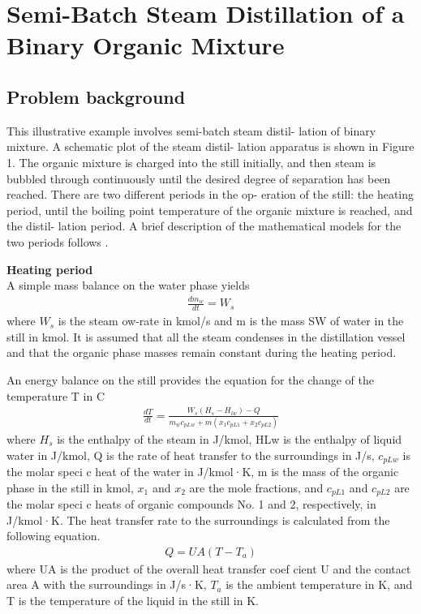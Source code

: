 \documentclass[12pt]{report}
\begin{document}
\section{Semi-Batch Steam Distillation of a Binary Organic Mixture}
\subsection{Problem background}
This illustrative example involves semi-batch steam distil- lation of binary mixture. A schematic plot of the steam distil- lation apparatus is shown in Figure 1. The organic mixture is charged into the still initially, and then steam is bubbled through continuously until the desired degree of separation has been reached. There are two different periods in the op- eration of the still: the heating period, until the boiling point temperature of the organic mixture is reached, and the distil- lation period. A brief description of the mathematical models for the two periods follows \cite{PHD}.

\textbf{Heating period} \\
A simple mass balance on the water phase yields
\begin{gather*}
\frac{dm_w}{dt} = W_s 
\end{gather*}
where $W_s$ is the steam  ow-rate in kmol/s and m is the mass SW
of water in the still in kmol. It is assumed that all the steam condenses in the distillation vessel and that the organic phase masses remain constant during the heating period.

An energy balance on the still provides the equation for the change of the temperature T in \degree C
\begin{gather*}
\frac{dT}{dt} = \frac{W_s(H_s-H_{lw}) - Q}{m_wc_{pLw}+m(x_1c_{pL1}+x_2c_{pL2})}
\end{gather*}
where $H_s$ is the enthalpy of the steam in J/kmol, HLw is the enthalpy of liquid water in J/kmol, Q is the rate of heat transfer to the surroundings in J/s, $c_{pLw}$ is the molar speci c heat of the water in J/kmol·K, m is the mass of the organic phase in the still in kmol, $x_1$ and $x_2$ are the mole fractions, and $c_{pL1}$ and $c_{pL2}$ are the molar speci c heats of organic compounds No. 1 and 2, respectively, in J/kmol·K. The heat transfer rate to the surroundings is calculated from the following equation.
\begin{gather*}
Q = UA(T - T_a)
\end{gather*}
where UA is the product of the overall heat transfer coef cient U and the contact area A with the surroundings in J/s·K, $T_a$ is the ambient temperature in K, and T is the temperature of the liquid in the still in K.
\end{document}
